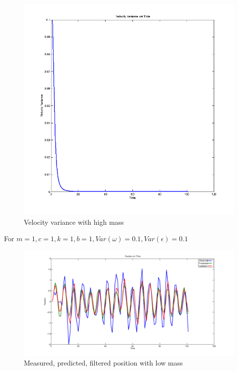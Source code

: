 \documentclass[12pt]{article}
\begin{document}
\begin{figure}
    \includegraphics[width=\linewidth]{kalman-variance2-m100}
    \caption{Velocity variance with high mass}
\end{figure}


For $m=1,c=1,k=1,b=1, Var(\omega)=0.1, Var(\epsilon)=0.1$


\begin{figure}
    \includegraphics[width=\linewidth]{kalman-position-m1}
    \caption{Measured, predicted, filtered position with low mass}
\end{figure}
\end{document}
